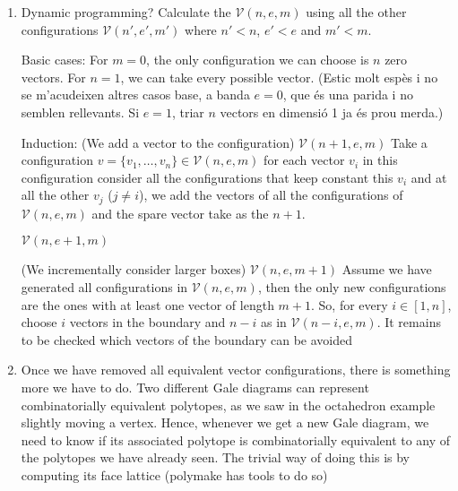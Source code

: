 \documentclass[11pt]{article}
\begin{document}
\begin{enumerate}
\item Dynamic programming? Calculate the $\mathcal{V}(n,e,m)$ using all the other configurations $\mathcal{V}(n',e',m')$ where $n'<n$, $e'<e$ and $m'<m$. 

Basic cases:
For $m=0$, the only configuration we can choose is $n$ zero vectors.
For $n=1$, we can take every possible vector.
(Estic molt esp\`es i no se m'acudeixen altres casos base, a banda $e=0$, que \'es una parida i no semblen rellevants. Si $e=1$, triar $n$ vectors en dimensi\'o 1 ja \'es prou merda.)

Induction:
(We add a vector to the configuration) $\mathcal{V}(n + 1,e,m)$
Take a configuration $v = \{v_1, \ldots, v_n\}\in \mathcal{V}(n,e,m)$ for each vector $v_i$ in this configuration consider all the configurations that keep constant this $v_i$ and at all the other $v_j$ ($j \neq i$), we add the vectors of all the configurations of $\mathcal{V}(n,e,m)$ and the spare vector take as the $n+1$.

$\mathcal{V}(n,e + 1,m)$

(We incrementally consider larger boxes) $\mathcal{V}(n,e,m + 1)$
Assume we have generated all configurations in $\mathcal{V}(n,e,m)$, then the only new configurations are the ones with at least one vector of length $m+1$. So, for every $i \in [1,n]$, choose $i$ vectors in the boundary and $n-i$ as in $\mathcal{V}(n-i,e,m)$. It remains to be checked which vectors of the boundary can be avoided


\item Once we have removed all equivalent vector configurations, there is something more we have to do. Two different Gale diagrams can represent combinatorially equivalent polytopes, as we saw in the octahedron example slightly moving a vertex. Hence, whenever we get a new Gale diagram, we need to know if its associated polytope is combinatorially equivalent to any of the polytopes we have already seen. The trivial way of doing this is by computing its face lattice (polymake has tools to do so) 
\end{enumerate}
\end{document}

